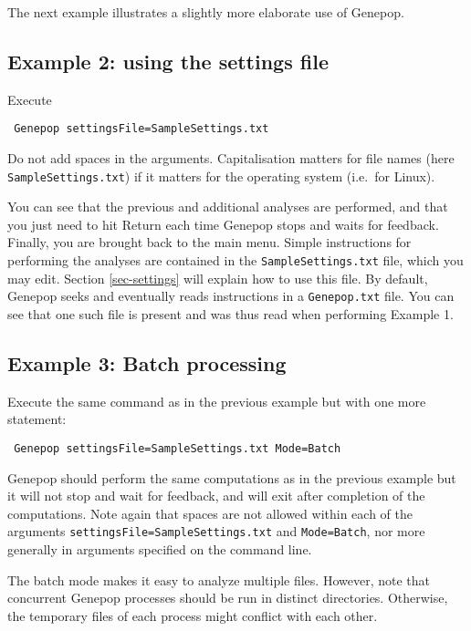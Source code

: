 \documentclass[12pt,]{book}
\theoremstyle{definition}
\theoremstyle{definition}
\theoremstyle{definition}
\theoremstyle{remark}
\begin{document}
The next example illustrates a slightly more elaborate use of Genepop.

\subsection{Example 2: using the settings
file}\label{example-2-using-the-settings-file}

Execute

\begin{verbatim}
 Genepop settingsFile=SampleSettings.txt
\end{verbatim}

Do not add spaces in the arguments.
Capitalisation matters for file names (here \texttt{SampleSettings.txt})
if it matters for the operating system (i.e.~for Linux).

You can see that the previous and additional analyses are performed, and
that you just need to hit Return each time Genepop stops and waits for
feedback. Finally, you are brought back to the main menu. Simple
instructions for performing the analyses are contained in the
\texttt{SampleSettings.txt} file, which you may edit. Section
\ref{sec-settings} will explain how to use this file. By default,
Genepop seeks and eventually reads instructions in a
\texttt{Genepop.txt} file. You can see that one such file is present and
was thus read when performing Example 1.

\subsection{Example 3: Batch
processing}\label{example-3-batch-processing}

Execute the same command as in the previous example but with one more
statement:

\begin{verbatim}
 Genepop settingsFile=SampleSettings.txt Mode=Batch
\end{verbatim}

 Genepop should perform the same
computations as in the previous example but it will not stop and wait
for feedback, and will exit after completion of the computations. Note
again that spaces are not allowed within each of the arguments
\texttt{settingsFile=SampleSettings.txt} and \texttt{Mode=Batch}, nor
more generally in arguments specified on the command line.

The batch mode makes it easy to analyze multiple files. However, note
that concurrent Genepop processes should be
run in distinct directories. Otherwise, the temporary files of each
process might conflict with each other.
\end{document}
